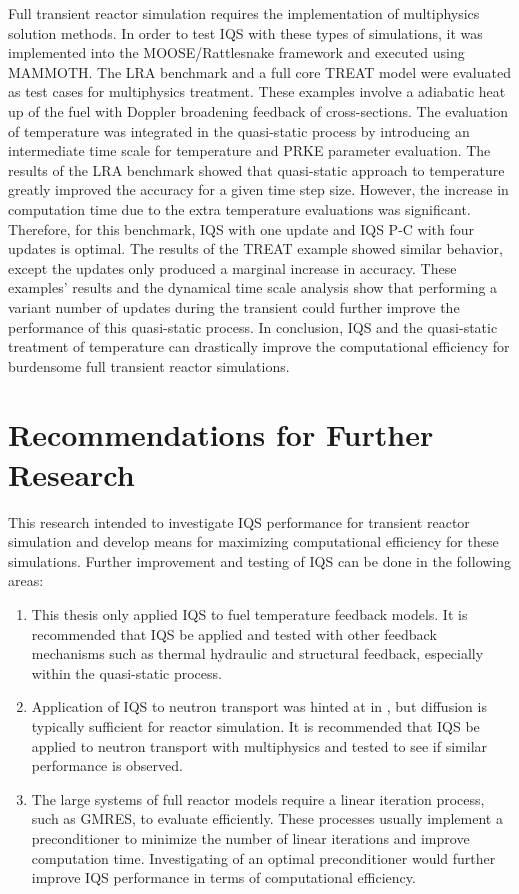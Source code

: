 Full transient reactor simulation requires the implementation of multiphysics solution methods. In order to test IQS with these types of simulations, it was implemented into the MOOSE/Rattlesnake framework and executed using MAMMOTH. The LRA benchmark and a full core TREAT model were evaluated as test cases for multiphysics treatment. These examples involve a adiabatic heat up of the fuel with Doppler broadening feedback of cross-sections. The evaluation of temperature was integrated in the quasi-static process by introducing an intermediate time scale for temperature and PRKE parameter evaluation. The results of the LRA benchmark showed that quasi-static approach to temperature greatly improved the accuracy for a given time step size. However, the increase in computation time due to the extra temperature evaluations was significant. Therefore, for this benchmark, IQS with one update and IQS P-C with four updates is optimal. The results of the TREAT example showed similar behavior, except the updates only produced a marginal increase in accuracy. These examples' results and the dynamical time scale analysis show that performing a variant number of updates during the transient could further improve the performance of this quasi-static process. In conclusion, IQS and the quasi-static treatment of temperature can drastically improve the computational efficiency for burdensome full transient reactor simulations.

\section{Recommendations for Further Research}

This research intended to investigate IQS performance for transient reactor simulation and develop means for maximizing computational efficiency for these simulations. Further improvement and testing of IQS can be done in the following areas:

\begin{enumerate}

\item This thesis only applied IQS to fuel temperature feedback models. It is recommended that IQS be applied and tested with other feedback mechanisms such as thermal hydraulic and structural feedback, especially within the quasi-static process.

\item Application of IQS to neutron transport was hinted at in , but diffusion is typically sufficient for reactor simulation. It is recommended that IQS be applied to neutron transport with multiphysics and tested to see if similar performance is observed.

\item The large systems of full reactor models require a linear iteration process, such as GMRES, to evaluate efficiently. These processes usually implement a preconditioner to minimize the number of linear iterations and improve computation time. Investigating of an optimal preconditioner would further improve IQS performance in terms of computational efficiency.

\end{enumerate}